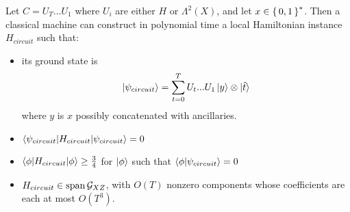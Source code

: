 \begin{theorem}
	Let $C=U_T\ldots U_1$ where $U_i$ are either $H$ or $\Lambda^2(X)$, and let $x\in\set{0, 1}^*$. Then a classical machine can construct in polynomial time a local Hamiltonian instance $H_{circuit}$ such that:
	\begin{itemize}
		\item its ground state is $$\ket{\psi_{circuit}}=\sum_{t=0}^TU_t...U_1\ket{y}\otimes\ket{\hat{t}}$$ where $y$ is $x$ possibly concatenated with ancillaries.
		\item $\braket{\psi_{circuit}|H_{circuit}|\psi_{circuit}}=0$
		\item {} $\braket{\phi|H_{circuit}|\phi}\geq\frac{3}{4}$ for $\ket\phi$ such that $\braket{\phi|\psi_{circuit}}=0$
		\item $H_{circuit}\in\operatorname*{\operatorname{span}}\mathcal{G}_{XZ}$, with $O(T)$ nonzero components whose coefficients are each at most $O(T^3)$.
	\end{itemize}
\end{theorem}

